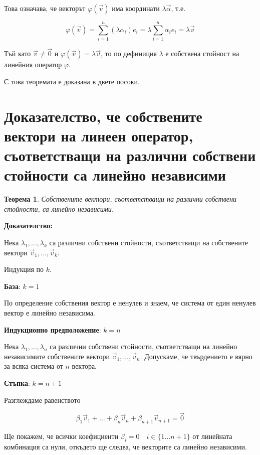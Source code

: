 \documentclass{scrartcl}
\newtheorem{theorem}{Теорема}
\begin{document}
\begin{FlushLeft}
Това означава, че векторът $\varphi(\vec{v})$ има координати $\lambda \vec{\alpha}$, т.е.

$$\varphi(\vec{v}) = \sum_{i=1}^n (\lambda \alpha_i) e_i = \lambda \sum_{i=1}^n \alpha_i e_i = \lambda \vec{v}$$

Тъй като $\vec{v} \neq \vec{0}$ и $\varphi(\vec{v}) = \lambda \vec{v}$, то по дефиниция $\lambda$ е собствена стойност на линейния оператор $\varphi$.

С това теоремата е доказана в двете посоки.

\section{Доказателство, че собствените вектори на линеен
оператор, съответстващи на различни собствени стойности са линейно независими}

\begin{theorem}\label{theorem_linear_independency}
Собствените вектори, съответстващи на различни собствени стойности, са линейно независими.
\end{theorem}

\textbf{Доказателство:}

Нека $\lambda_1, \dots, \lambda_k$ са различни собствени стойности, съответстващи на собствените вектори $\vec{v}_1, \dots, \vec{v}_k$.

Индукция по $k$.

\textbf{База}: $k= 1$

По определение собствения вектор е ненулев и знаем, че система от един ненулев вектор е линейно независима.

\textbf{Индукционно предположение}: $k = n$

Нека $\lambda_1, \dots, \lambda_n$ са различни собствени стойности, съответстващи на линейно независимите собствените вектори $\vec{v}_1, \dots, \vec{v}_n$. Допускаме, че твърдението е вярно за всяка система от $n$ вектора.

\textbf{Стъпка}: $k = n + 1$

Разглеждаме равенството

\begin{equation}
    \beta_1 \vec{v}_1 + \dots + \beta_n \vec{v}_n + \beta_{n+1} \vec{v}_{n+1} = \vec{0} \label{bofore_phi}
\end{equation}

Ще покажем, че всички коефициенти $\beta_i = 0 \quad i \in \{1 \dots n+1\}$ от линейната комбинация са нули, откъдето ще следва, че векторите са линейно независими.


\end{FlushLeft}
\end{document}

